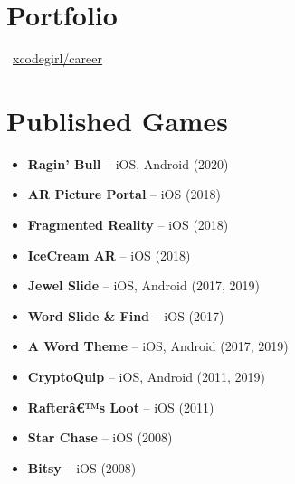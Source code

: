 \documentclass[10pt]{article}
\begin{document}
\section*{Portfolio}
~\href{https://github.com/xcodegirl/career/blob/main/xcodegirl-work-samples.md}{xcodegirl/career}\\

\section*{Published Games}
\begin{itemize}[nosep, leftmargin=*]
    \item \textbf{Ragin' Bull} -- iOS, Android (2020)
    \item \textbf{AR Picture Portal} -- iOS (2018)
    \item \textbf{Fragmented Reality} -- iOS (2018)
    \item \textbf{IceCream AR} -- iOS (2018)
    \item \textbf{Jewel Slide} -- iOS, Android (2017, 2019)
    \item \textbf{Word Slide \& Find} -- iOS (2017)
    \item \textbf{A Word Theme} -- iOS, Android (2017, 2019)
    \item \textbf{CryptoQuip} -- iOS, Android (2011, 2019)
    \item \textbf{Rafterâ€™s Loot} -- iOS (2011)
    \item \textbf{Star Chase} -- iOS (2008)
    \item \textbf{Bitsy} -- iOS (2008)
\end{itemize}
\end{document}
